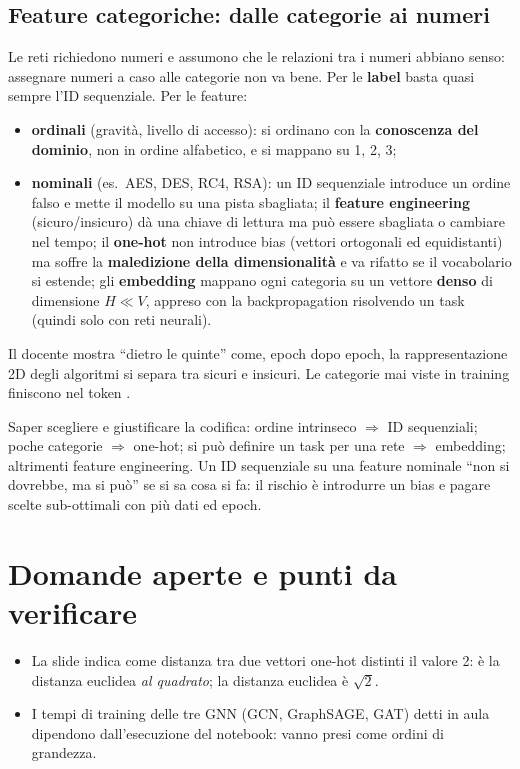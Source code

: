 \subsection{Feature categoriche: dalle categorie ai numeri}
Le reti richiedono numeri e assumono che le relazioni tra i numeri abbiano senso: assegnare numeri a caso
alle categorie non va bene. Per le \textbf{label} basta quasi sempre l'ID sequenziale. Per le feature:
\begin{itemize}
  \item \textbf{ordinali} (gravità, livello di accesso): si ordinano con la \textbf{conoscenza del dominio},
    non in ordine alfabetico, e si mappano su 1, 2, 3;
  \item \textbf{nominali} (es.\ AES, DES, RC4, RSA): un ID sequenziale introduce un ordine falso e mette il
    modello su una pista sbagliata; il \textbf{feature engineering} (sicuro/insicuro) dà una chiave di
    lettura ma può essere sbagliata o cambiare nel tempo; il \textbf{one-hot} non introduce bias (vettori
    ortogonali ed equidistanti) ma soffre la \textbf{maledizione della dimensionalità} e va rifatto se il
    vocabolario si estende; gli \textbf{embedding} mappano ogni categoria su un vettore \textbf{denso} di
    dimensione $H \ll V$, appreso con la backpropagation risolvendo un task (quindi solo con reti neurali).
\end{itemize}
Il docente mostra ``dietro le quinte'' come, epoch dopo epoch, la rappresentazione 2D degli algoritmi si
separa tra sicuri e insicuri. Le categorie mai viste in training finiscono nel token \textbf{}.

\begin{esame}
Saper scegliere e giustificare la codifica: ordine intrinseco $\Rightarrow$ ID sequenziali; poche
categorie $\Rightarrow$ one-hot; si può definire un task per una rete $\Rightarrow$ embedding; altrimenti
feature engineering. Un ID sequenziale su una feature nominale ``non si dovrebbe, ma si può'' se si sa
cosa si fa: il rischio è introdurre un bias e pagare scelte sub-ottimali con più dati ed epoch.
\end{esame}

\section{Domande aperte e punti da verificare}
\begin{verifica}
\begin{itemize}
  \item La slide indica come distanza tra due vettori one-hot distinti il valore 2: è la distanza euclidea
    \emph{al quadrato}; la distanza euclidea è $\sqrt{2}$.
  \item I tempi di training delle tre GNN (GCN, GraphSAGE, GAT) detti in aula dipendono dall'esecuzione del
    notebook: vanno presi come ordini di grandezza.
\end{itemize}
\end{verifica}
